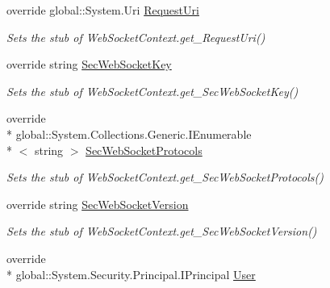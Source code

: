 \begin{DoxyCompactItemize}
override global\-::\-System.\-Uri \hyperlink{class_system_1_1_net_1_1_web_sockets_1_1_fakes_1_1_stub_web_socket_context_ab9c4947dcb3afda80ccd2fcf2d7cf598}{Request\-Uri}
\begin{DoxyCompactList}\small\item\em Sets the stub of Web\-Socket\-Context.\-get\-\_\-\-Request\-Uri()\end{DoxyCompactList}\item 
override string \hyperlink{class_system_1_1_net_1_1_web_sockets_1_1_fakes_1_1_stub_web_socket_context_abc2d062c2c8a8fc19d5c24fdcee5fca6}{Sec\-Web\-Socket\-Key}
\begin{DoxyCompactList}\small\item\em Sets the stub of Web\-Socket\-Context.\-get\-\_\-\-Sec\-Web\-Socket\-Key()\end{DoxyCompactList}\item 
override \\*
global\-::\-System.\-Collections.\-Generic.\-I\-Enumerable\\*
$<$ string $>$ \hyperlink{class_system_1_1_net_1_1_web_sockets_1_1_fakes_1_1_stub_web_socket_context_a3b1e7b6c59626d023b902eb17da35c36}{Sec\-Web\-Socket\-Protocols}
\begin{DoxyCompactList}\small\item\em Sets the stub of Web\-Socket\-Context.\-get\-\_\-\-Sec\-Web\-Socket\-Protocols()\end{DoxyCompactList}\item 
override string \hyperlink{class_system_1_1_net_1_1_web_sockets_1_1_fakes_1_1_stub_web_socket_context_ad46a80cf1fc2315972b2d74965953299}{Sec\-Web\-Socket\-Version}
\begin{DoxyCompactList}\small\item\em Sets the stub of Web\-Socket\-Context.\-get\-\_\-\-Sec\-Web\-Socket\-Version()\end{DoxyCompactList}\item 
override \\*
global\-::\-System.\-Security.\-Principal.\-I\-Principal \hyperlink{class_system_1_1_net_1_1_web_sockets_1_1_fakes_1_1_stub_web_socket_context_a417f26eb46f71388972b5c6ed77cdd01}{User}

\end{DoxyCompactItemize}
